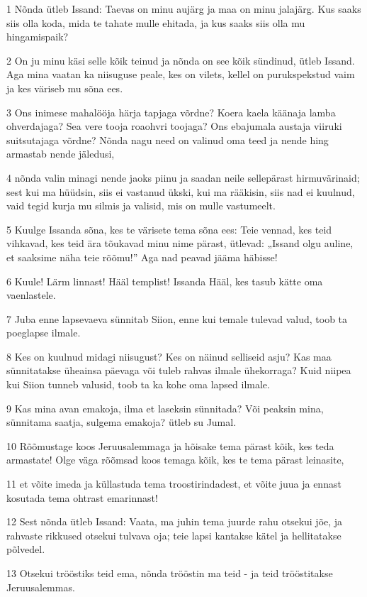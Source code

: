 \par 1 Nõnda ütleb Issand: Taevas on minu aujärg ja maa on minu jalajärg. Kus saaks siis olla koda, mida te tahate mulle ehitada, ja kus saaks siis olla mu hingamispaik?
\par 2 On ju minu käsi selle kõik teinud ja nõnda on see kõik sündinud, ütleb Issand. Aga mina vaatan ka niisuguse peale, kes on vilets, kellel on purukspekstud vaim ja kes väriseb mu sõna ees.
\par 3 Ons inimese mahalööja härja tapjaga võrdne? Koera kaela käänaja lamba ohverdajaga? Sea vere tooja roaohvri toojaga? Ons ebajumala austaja viiruki suitsutajaga võrdne? Nõnda nagu need on valinud oma teed ja nende hing armastab nende jäledusi,
\par 4 nõnda valin minagi nende jaoks piinu ja saadan neile sellepärast hirmuvärinaid; sest kui ma hüüdsin, siis ei vastanud ükski, kui ma rääkisin, siis nad ei kuulnud, vaid tegid kurja mu silmis ja valisid, mis on mulle vastumeelt.
\par 5 Kuulge Issanda sõna, kes te värisete tema sõna ees: Teie vennad, kes teid vihkavad, kes teid ära tõukavad minu nime pärast, ütlevad: „Issand olgu auline, et saaksime näha teie rõõmu!” Aga nad peavad jääma häbisse!
\par 6 Kuule! Lärm linnast! Hääl templist! Issanda Hääl, kes tasub kätte oma vaenlastele.
\par 7 Juba enne lapsevaeva sünnitab Siion, enne kui temale tulevad valud, toob ta poeglapse ilmale.
\par 8 Kes on kuulnud midagi niisugust? Kes on näinud selliseid asju? Kas maa sünnitatakse üheainsa päevaga või tuleb rahvas ilmale ühekorraga? Kuid niipea kui Siion tunneb valusid, toob ta ka kohe oma lapsed ilmale.
\par 9 Kas mina avan emakoja, ilma et laseksin sünnitada? Või peaksin mina, sünnitama saatja, sulgema emakoja? ütleb su Jumal.
\par 10 Rõõmustage koos Jeruusalemmaga ja hõisake tema pärast kõik, kes teda armastate! Olge väga rõõmsad koos temaga kõik, kes te tema pärast leinasite,
\par 11 et võite imeda ja küllastuda tema troostirindadest, et võite juua ja ennast kosutada tema ohtrast emarinnast!
\par 12 Sest nõnda ütleb Issand: Vaata, ma juhin tema juurde rahu otsekui jõe, ja rahvaste rikkused otsekui tulvava oja; teie lapsi kantakse kätel ja hellitatakse põlvedel.
\par 13 Otsekui trööstiks teid ema, nõnda trööstin ma teid - ja teid trööstitakse Jeruusalemmas.

